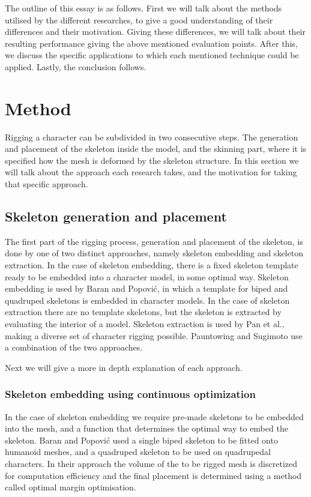 \documentclass{article}
\begin{document}
The outline of this essay is as follows. First we will talk about the methods
utilised by the different researches, to give a good understanding of their
differences and their motivation. Giving these differences, we will talk about
their resulting performance giving the above
mentioned evaluation points. After this, we discuss the specific applications to
which each mentioned technique could be applied. Lastly, the conclusion follows.

\section{Method}
Rigging a character can be subdivided in two consecutive steps. The generation
and placement of the skeleton inside the model, and the skinning part, where it
is specified how the mesh is deformed by the skeleton structure. In this section we will talk
about the approach each research takes, and the motivation for
taking that specific approach.

\subsection{Skeleton generation and placement}
The first part of the rigging process, generation and placement of the skeleton, 
is done by one of two distinct approaches, namely skeleton
embedding and skeleton extraction. In the case of skeleton embedding, there
is a fixed skeleton template ready to be embedded into a character model,
in some optimal way. Skeleton embedding is used by
Baran and Popovi\'{c}\citep{paper1}, in which a template for biped and quadruped skeletons is
embedded in character models. In the case of skeleton extraction there
are no template skeletons, but the skeleton is extracted by evaluating the
interior of a model. Skeleton extraction is used by Pan et al.\citep{paper2},
making a diverse set of character rigging possible.
Pauntowing and Sugimoto \citep{paper3} use a combination of the two approaches.

Next we will give a more in depth explanation of each approach.

\subsubsection{Skeleton embedding using continuous optimization}
In the case of skeleton embedding we require pre-made skeletons to be embedded into the mesh,
and a function that determines the optimal way to embed the skeleton.
Baran and Popovi\'{c} used a single biped skeleton to be fitted onto
humanoid meshes, and a quadruped skeleton to be used on quadrupedal characters.
In their approach the volume of the to be rigged mesh is discretized for
computation efficiency and the final placement is determined using a method
called optimal margin optimisation.
\end{document}
